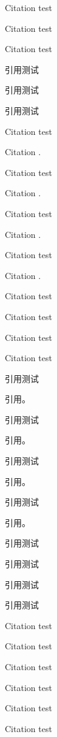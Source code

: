 \documentclass[UTF8,scheme=plain,fontset=fandol]{ctexart}
\begin{document}
\START
\showoutput

Citation \cite{jon88} test\par
Citation \cite{jon89} test\par
Citation \cite{jon90} test\par

引用\cite{lzp1}测试\par
引用\cite{lzp2}测试\par
引用\cite{lzp3}测试\par

Citation \citet{jon90} test\par
Citation \citet{jon90}.\par
Citation \citet[42]{jon90} test\par
Citation \citet[42]{jon90}.\par
Citation \citep{jon90} test\par
Citation \citep{jon90}.\par
Citation \citep[42]{jon90} test\par
Citation \citep[42]{jon90}.\par
Citation \citep[see][]{jon90} test\par
Citation \citep[see][42]{jon90} test\par
Citation \citet*{jon90} test\par
Citation \citep*{jon90} test\par

引用\citet{lzp3}测试\par
引用\citet{lzp3}。\par
引用\citet[42]{lzp3}测试\par
引用\citet[42]{lzp3}。\par
引用\citep{lzp3}测试\par
引用\citep{lzp3}。\par
引用\citep[42]{lzp3}测试\par
引用\citep[42]{lzp3}。\par
引用\citep[见][]{lzp3}测试\par
引用\citep[见][42]{lzp3}测试\par
引用\citet*{lzp3}测试\par
引用\citep*{lzp3}测试\par

Citation \citet{jon90,jam91} test\par
Citation \citet{jon90,jon91} test\par
Citation \citet{jon92a,jon92b} test\par
Citation \citep{jon90,jam91} test\par
Citation \citep{jon90,jon91} test\par
Citation \citep{jon92a,jon92b} test\par
\end{document}
